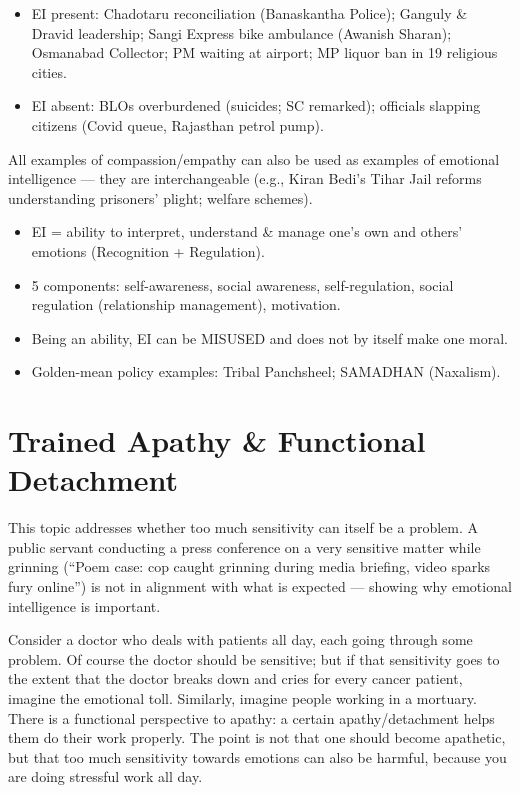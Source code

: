 \begin{ExampleBox}
\begin{itemize}
\item EI present: Chadotaru reconciliation (Banaskantha Police); Ganguly \& Dravid leadership; Sangi Express bike ambulance (Awanish Sharan); Osmanabad Collector; PM waiting at airport; MP liquor ban in 19 religious cities.
\item EI absent: BLOs overburdened (suicides; SC remarked); officials slapping citizens (Covid queue, Rajasthan petrol pump).
\end{itemize}
\end{ExampleBox}

\begin{KeyConcept}
All examples of compassion/empathy can also be used as examples of emotional intelligence --- they are interchangeable (e.g., Kiran Bedi's Tihar Jail reforms understanding prisoners' plight; welfare schemes).
\end{KeyConcept}

\begin{QuickRevision}
\begin{itemize}
\item EI = ability to interpret, understand \& manage one's own and others' emotions (Recognition + Regulation).
\item 5 components: self-awareness, social awareness, self-regulation, social regulation (relationship management), motivation.
\item Being an ability, EI can be MISUSED and does not by itself make one moral.
\item Golden-mean policy examples: Tribal Panchsheel; SAMADHAN (Naxalism).
\end{itemize}
\end{QuickRevision}

\section{Trained Apathy \& Functional Detachment}

This topic addresses whether too much sensitivity can itself be a problem. A public servant conducting a press conference on a very sensitive matter while grinning (``Poem case: cop caught grinning during media briefing, video sparks fury online'') is not in alignment with what is expected --- showing why emotional intelligence is important.

Consider a doctor who deals with patients all day, each going through some problem. Of course the doctor should be sensitive; but if that sensitivity goes to the extent that the doctor breaks down and cries for every cancer patient, imagine the emotional toll. Similarly, imagine people working in a mortuary. There is a functional perspective to apathy: a certain apathy/detachment helps them do their work properly. The point is not that one should become apathetic, but that too much sensitivity towards emotions can also be harmful, because you are doing stressful work all day.

